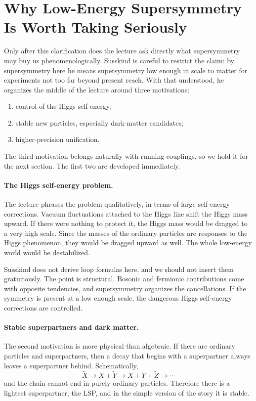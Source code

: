 \section{Why Low-Energy Supersymmetry Is Worth Taking Seriously}

Only after this clarification does the lecture ask directly what supersymmetry may buy us phenomenologically. Susskind is careful to restrict the claim: by supersymmetry here he means supersymmetry low enough in scale to matter for experiments not too far beyond present reach. With that understood, he organizes the middle of the lecture around three motivations:
\begin{enumerate}
\item control of the Higgs self-energy;
\item stable new particles, especially dark-matter candidates;
\item higher-precision unification.
\end{enumerate}
The third motivation belongs naturally with running couplings, so we hold it for the next section. The first two are developed immediately.

\paragraph{The Higgs self-energy problem.}
The lecture phrases the problem qualitatively, in terms of large self-energy corrections. Vacuum fluctuations attached to the Higgs line shift the Higgs mass upward. If there were nothing to protect it, the Higgs mass would be dragged to a very high scale. Since the masses of the ordinary particles are responses to the Higgs phenomenon, they would be dragged upward as well. The whole low-energy world would be destabilized.

Susskind does not derive loop formulas here, and we should not insert them gratuitously. The point is structural. Bosonic and fermionic contributions come with opposite tendencies, and supersymmetry organizes the cancellations. If the symmetry is present at a low enough scale, the dangerous Higgs self-energy corrections are controlled.

\paragraph{Stable superpartners and dark matter.}
The second motivation is more physical than algebraic. If there are ordinary particles and superpartners, then a decay that begins with a superpartner always leaves a superpartner behind. Schematically,
\begin{equation}
\tilde X \rightarrow X+\tilde Y \rightarrow X+Y+\tilde Z \rightarrow \cdots
\end{equation}
and the chain cannot end in purely ordinary particles. Therefore there is a lightest superpartner, the LSP, and in the simple version of the story it is stable.


